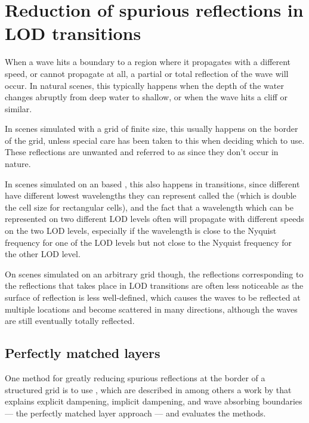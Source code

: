 \section{Reduction of spurious reflections in LOD transitions}

When a wave hits a boundary to a region where it propagates with a different speed, or cannot propagate at all, a partial or total reflection of the wave will occur. In natural scenes, this typically happens when the depth of the water changes abruptly from deep water to shallow, or when the wave hits a cliff or similar.

In scenes simulated with a grid of finite size, this usually happens on the border of the grid, unless special care has been taken to this when deciding which  to use. These reflections are unwanted and referred to as  since they don't occur in nature.

In scenes simulated on an \octree based \grid, this also happens in \LOD transitions, since different  have different lowest wavelengths they can represent called the  (which is double the cell size for rectangular cells), and the fact that a wavelength which can be represented on two different LOD levels often will propagate with different speeds on the two LOD levels, especially if the wavelength is close to the Nyquist frequency for one of the LOD levels but not close to the Nyquist frequency for the other LOD level.

On scenes simulated on an arbitrary grid though, the reflections corresponding to the reflections that takes place in LOD transitions are often less noticeable as the surface of reflection is less well-defined, which causes the waves to be reflected at multiple locations and become scattered in many directions, although the waves are still eventually totally reflected.

\subsection{Perfectly matched layers}

One method for greatly reducing spurious reflections at the border of a structured grid is to use , which are described in among others a work by \citet{Soderstrom2010} that explains explicit dampening, implicit dampening, and wave absorbing boundaries --- the perfectly matched layer approach --- and evaluates the methods.


